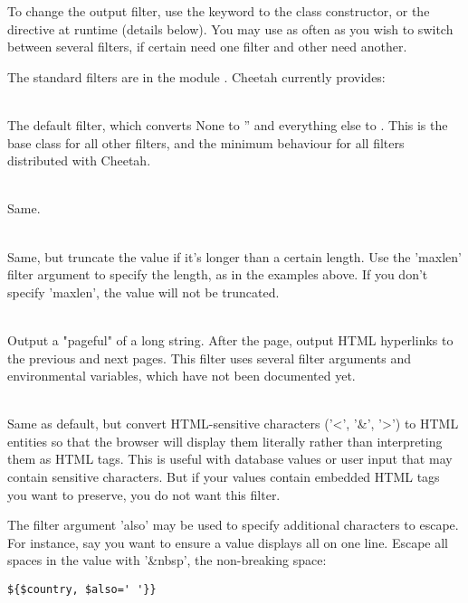 To change the output filter, use the  keyword to the
 class constructor, or the 
directive at runtime (details below).  You may use  as often as
you wish to switch between several filters, if certain 
need one filter and other  need another.

The standard filters are in the module .  Cheetah
currently provides:

\begin{description}
\item{}
     \\ The default filter, which converts None to '' and everything else to
     .  This is the base class for all other filters,
     and the minimum behaviour for all filters distributed with Cheetah.
\item{}
     \\ Same.
\item{}
     \\ Same, but truncate the value if it's longer than a certain length.
     Use the 'maxlen' filter argument to specify the length, as in the
     examples above.  If you don't specify 'maxlen', the value will not be
     truncated.
\item{}
     \\ Output a "pageful" of a long string.  After the page, output HTML
     hyperlinks to the previous and next pages.  This filter uses several
     filter arguments and environmental variables, which have not been 
     documented yet.
\item{}
     \\ Same as default, but convert HTML-sensitive characters ('<', '\&', '>')
     to HTML entities so that the browser will display them literally rather
     than interpreting them as HTML tags.  This is useful with database values
     or user input that may contain sensitive characters.  But if your values
     contain embedded HTML tags you want to preserve, you do not want this 
     filter.
     
     The filter argument 'also' may be used to specify additional characters to
     escape.  For instance, say you want to ensure a value displays all on one
     line.  Escape all spaces in the value with '\&nbsp', the non-breaking
     space:
\begin{verbatim}
${$country, $also=' '}}
\end{verbatim}
\end{description}

